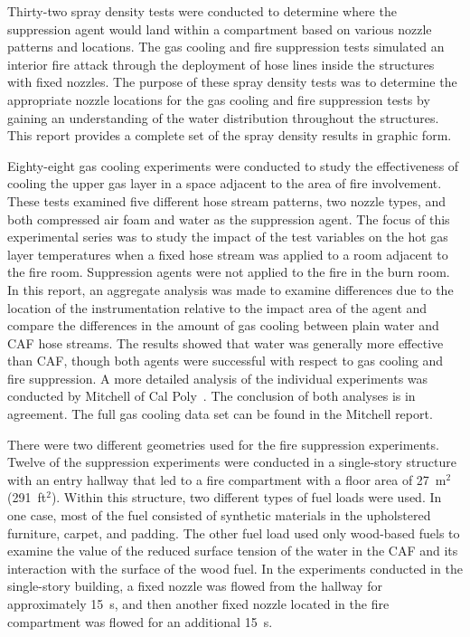 \documentclass[12pt,oneside]{book}
\begin{document}
Thirty-two spray density tests were conducted to determine where the suppression agent would land within a compartment based on various nozzle patterns and locations. The gas cooling and fire suppression tests simulated an interior fire attack through the deployment of hose lines inside the structures with fixed nozzles. The purpose of these spray density tests was to determine the appropriate nozzle locations for the gas cooling and fire suppression tests by gaining an understanding of the water distribution throughout the structures. This report provides a complete set of the spray density results in graphic form.

Eighty-eight gas cooling experiments were conducted to study the effectiveness of cooling the upper gas layer in a space adjacent to the area of fire involvement. These tests examined five different hose stream patterns, two nozzle types, and both compressed air foam and water as the suppression agent. The focus of this experimental series was to study the impact of the test variables on the hot gas layer temperatures when a fixed hose stream was applied to a room adjacent to the fire room. Suppression agents were not applied to the fire in the burn room. In this report, an aggregate analysis was made to examine differences due to the location of the instrumentation relative to the impact area of the agent and compare the differences in the amount of gas cooling between plain water and CAF hose streams. The results showed that water was generally more effective than CAF, though both agents were successful with respect to gas cooling and fire suppression. A more detailed analysis of the individual experiments was conducted by Mitchell of Cal Poly~\cite{Mitchell:1}. The conclusion of both analyses is in agreement. The full gas cooling data set can be found in the Mitchell report.    

There were two different geometries used for the fire suppression experiments. Twelve of the suppression experiments were conducted in a single-story structure with an entry hallway that led to a fire compartment with a floor area of 27~m$^2$ (291~ft$^2$). Within this structure, two different types of fuel loads were used. In one case, most of the fuel consisted of synthetic materials in the upholstered furniture, carpet, and padding. The other fuel load used only wood-based fuels to examine the value of the reduced surface tension of the water in the CAF and its interaction with the surface of the wood fuel. In the experiments conducted in the single-story building, a fixed nozzle was flowed from the hallway for approximately 15~s, and then another fixed nozzle located in the fire compartment was flowed for an additional 15~s.   
\end{document}
